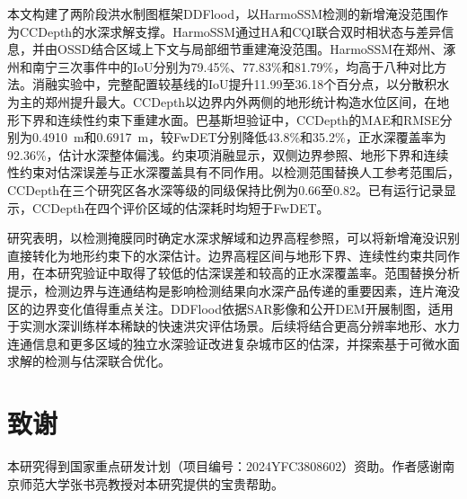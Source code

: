\documentclass[authoryear,preprint,12pt]{elsarticle}
\begin{document}
本文构建了两阶段洪水制图框架DDFlood，以HarmoSSM检测的新增淹没范围作为CCDepth的水深求解支撑。HarmoSSM通过HA和CQI联合双时相状态与差异信息，并由OSSD结合区域上下文与局部细节重建淹没范围。HarmoSSM在郑州、涿州和南宁三次事件中的IoU分别为79.45\%、77.83\%和81.79\%，均高于八种对比方法。消融实验中，完整配置较基线的IoU提升11.99至36.18个百分点，以分散积水为主的郑州提升最大。CCDepth以边界内外两侧的地形统计构造水位区间，在地形下界和连续性约束下重建水面。巴基斯坦验证中，CCDepth的MAE和RMSE分别为0.4910~m和0.6917~m，较FwDET分别降低43.8\%和35.2\%，正水深覆盖率为92.36\%，估计水深整体偏浅。约束项消融显示，双侧边界参照、地形下界和连续性约束对估深误差与正水深覆盖具有不同作用。以检测范围替换人工参考范围后，CCDepth在三个研究区各水深等级的同级保持比例为0.66至0.82。已有运行记录显示，CCDepth在四个评价区域的估深耗时均短于FwDET。

研究表明，以检测掩膜同时确定水深求解域和边界高程参照，可以将新增淹没识别直接转化为地形约束下的水深估计。边界高程区间与地形下界、连续性约束共同作用，在本研究验证中取得了较低的估深误差和较高的正水深覆盖率。范围替换分析提示，检测边界与连通结构是影响检测结果向水深产品传递的重要因素，连片淹没区的边界变化值得重点关注。DDFlood依据SAR影像和公开DEM开展制图，适用于实测水深训练样本稀缺的快速洪灾评估场景。后续将结合更高分辨率地形、水力连通信息和更多区域的独立水深验证改进复杂城市区的估深，并探索基于可微水面求解的检测与估深联合优化。

\section*{致谢}

\begin{sloppypar}
本研究得到国家重点研发计划（项目编号：2024YFC3808602）资助。作者感谢南京师范大学张书亮教授对本研究提供的宝贵帮助。
\end{sloppypar}


\begingroup
\singlespacing

\endgroup
\end{document}
